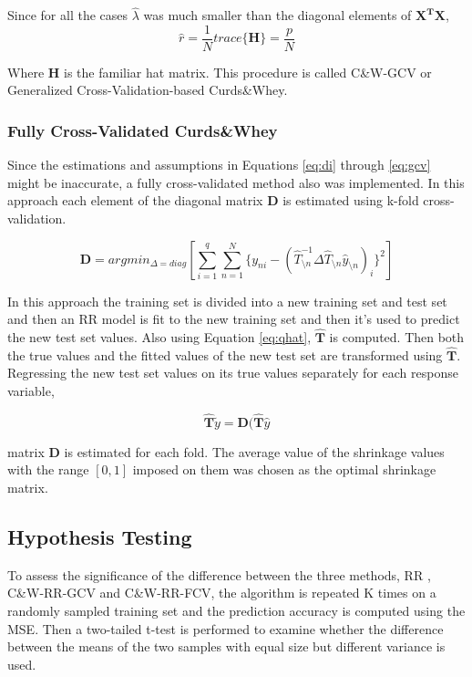 \documentclass[a4paper]{article}
\begin{document}
Since for all the cases $\hat{\lambda}$ was much smaller than the diagonal elements of $\mathbf{X^TX}$,
\begin{equation}
\label{eq:gcv}
\hat{r} = \frac{1}{N}trace\{ \mathbf{H} \} = \frac{p}{N}
\end{equation}

Where $\mathbf{H}$ is the familiar hat matrix. This procedure is  called C\&W-GCV or Generalized Cross-Validation-based Curds\&Whey.

\subsubsection{Fully Cross-Validated Curds\&Whey}
Since the estimations and assumptions in Equations \ref{eq:di} through \ref{eq:gcv} might be inaccurate, a fully cross-validated method also was implemented. In this approach each element of the diagonal matrix $\mathbf{D}$ is estimated using k-fold cross-validation.

\begin{equation}
\mathbf{D} = argmin_{\Delta = diag} [\sum_{i = 1}^q \sum_{n = 1}^N \{ y_{ni} - (\hat{T}_{\setminus n}^{-1} \Delta \hat{T}_{\setminus n} \hat{y}_{\setminus n})_i \}^2]
\end{equation}


In this approach the training set is divided into a new training set and test set and then an RR model is fit to the new training set and then it's used to predict the new test set values. Also using Equation \ref{eq:qhat}, $\hat{\mathbf{T}}$ is computed. Then both the true values and the fitted values of the new test set are transformed using $\hat{\mathbf{T}}$. Regressing the new test set values on its true values separately for each response variable,

\begin{equation}
\hat{\mathbf{T}}\tilde{y} = \mathbf{D} (\hat{\mathbf{T}} \hat{y}
\end{equation}

matrix $\mathbf{D}$ is estimated for each fold. The average value of the shrinkage values with the range $[0,1]$ imposed on them was chosen as the optimal shrinkage matrix.

\subsection{Hypothesis Testing}
To assess the significance of the difference between the three methods, RR , C\&W-RR-GCV and C\&W-RR-FCV, the algorithm is repeated K times on a randomly sampled training set and the prediction accuracy is computed using the MSE. Then a two-tailed t-test is performed to examine whether the difference between the means of the two samples with equal size but different variance is used.
\end{document}
